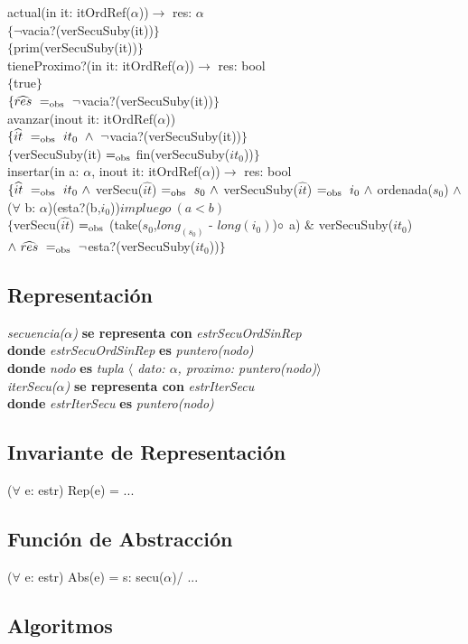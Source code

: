 actual(in it: itOrdRef($\alpha$))$\longrightarrow$ res: $\alpha$\\
$\{\neg$vacia?(verSecuSuby(it))$\}$\\
$\{$prim(verSecuSuby(it))$\}$\\

tieneProximo?(in it: itOrdRef($\alpha$))$\longrightarrow$ res: bool\\
$\{$true$\}$\\
$\{\widehat{res}\ \igobs\ \neg$vacia?(verSecuSuby(it))$\}$\\

avanzar(inout it: itOrdRef($\alpha$))\\
$\{\widehat{it}\ \igobs\ it_0\ \wedge\ \neg$vacia?(verSecuSuby(it))$\}$\\
$\{$verSecuSuby(it) $=_{\mathrm{obs}}$ fin(verSecuSuby($it_0$))$\}$\\

insertar(in a: $\alpha$, inout it: itOrdRef($\alpha$))$\longrightarrow$ res: bool\\
$\{\widehat{it}\ =_{\mathrm{obs}}\ it_0\ \wedge$ verSecu($\widehat{it}$) $=_{\mathrm{obs}}\ s_0\ \wedge$ verSecuSuby($\widehat{it}$) $=_{\mathrm{obs}}\ i_0\ \wedge$ ordenada($s_0$) $\wedge$ ($\forall$ b: $\alpha$)(esta?(b,$i_0$))$impluego\ (a < b)$\\
$\{$verSecu($\widehat{it}$) $=_{\mathrm{obs}}$ (take($s_0$,$long_(s_0)$ - $long(i_0)$)$\circ$ a) $\&$ verSecuSuby($it_0$) $\wedge\ \widehat{res}\ \igobs\ \neg$esta?(verSecuSuby($it_0$))$\}$


\subsection*{Representaci\'on}
\textit{secuencia($\alpha$)} \textbf{se representa con} \textit{estrSecuOrdSinRep}\\
\textbf{donde} \textit{estrSecuOrdSinRep} \textbf{es} \textit{puntero(nodo)}\\
\textbf{donde} \textit{nodo} \textbf{es} \textit{tupla $\langle$ dato: $\alpha$, proximo: puntero(nodo)$\rangle$}\\

\textit{iterSecu($\alpha$)} \textbf{se representa con} \textit{estrIterSecu}\\
\textbf{donde} \textit{estrIterSecu} \textbf{es} \textit{puntero(nodo)}\\

\subsection*{Invariante de Representaci\'on}
\vspace{11pt}
($\forall$ e: estr) Rep(e) = ...
\vspace{33pt}

\subsection*{Funci\'on de Abstracci\'on}
\vspace{11pt}
($\forall$ e: estr) Abs(e) = s: secu($\alpha$)/ ...
\vspace{33pt}

\subsection*{Algoritmos}

